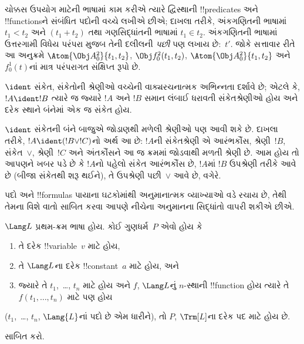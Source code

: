 \documentclass[../../../include/open-logic-section]{subfiles}
\begin{document}
ચોક્કસ ઉપયોગ માટેની ભાષામાં કામ કરીએ ત્યારે દ્વિસ્થાની
!!{predicate}s અને !!{function}sને સંબંધિત પદોની વચ્ચે લખીએ છીએ;
દાખલા તરીકે, અંકગણિતની ભાષામાં $t_1<t_2$ અને $(t_1+t_2)$ તથા
ગણસિદ્ધાંતની ભાષામાં $t_1\in t_2$. અંકગણિતની ભાષામાં ઉત્તરગામી
વિધેય પરંપરા મુજબ તેની દલીલની \emph{પછી} પણ લખાય છે:~$t'$. જોકે
સત્તાવાર રીતે આ અનુક્રમે $\Atom{\Obj A^2_0}{t_1,t_2}$,
$\Obj f^2_0(t_1,t_2)$, $\Atom{\Obj A^2_0}{t_1,t_2}$ અને
$f^1_0(t)$નાં માત્ર પરંપરાગત સંક્ષિપ્ત રૂપો છે.

\begin{defn}[વાક્યરચનાત્મક અભિન્નતા]
$\ident$ સંકેત, સંકેતોની શ્રેણીઓ વચ્ચેની વાક્યરચનાત્મક અભિન્નતા
દર્શાવે છે; એટલે કે, $!A \ident !B$ ત્યારે જ જ્યારે $!A$ અને $!B$
સમાન લંબાઈ ધરાવતી સંકેતશ્રેણીઓ હોય અને દરેક સ્થાને બંનેમાં એક જ
સંકેત હોય.
\end{defn}

$\ident$ સંકેતની બંને બાજુએ જોડાણથી મળેલી શ્રેણીઓ પણ આવી શકે છે.
દાખલા તરીકે, $!A \ident (!B \lor !C)$નો અર્થ આ છે: $!A$ની
સંકેતશ્રેણી એ આરંભકૌંસ, શ્રેણી~$!B$, સંકેત~$\lor$, શ્રેણી~$!C$ અને
અંતકૌંસને આ જ ક્રમમાં જોડવાથી મળતી શ્રેણી છે. આમ હોય તો આપણને ખબર
પડે છે કે $!A$નો પહેલો સંકેત આરંભકૌંસ છે, $!A$માં $!B$ ઉપશ્રેણી
તરીકે આવે છે (બીજા સંકેતથી શરૂ થઈને), તે ઉપશ્રેણી પછી~$\lor$ આવે છે,
વગેરે.

પદો અને !!{formula}s પાયાના ઘટકોમાંથી અનુમાનાત્મક વ્યાખ્યાઓ વડે
રચાય છે, તેથી તેમના વિશે વાતો સાબિત કરવા આપણે નીચેના અનુમાનના
સિદ્ધાંતો વાપરી શકીએ છીએ.

\begin{lem}[\emph{પદો પર અનુમાનનો સિદ્ધાંત}]
    $\Lang L$ પ્રથમ-ક્રમ ભાષા હોય. કોઈ ગુણધર્મ~$P$ એવો હોય કે
    \begin{enumerate}
        \item તે દરેક !!{variable}~$v$ માટે હોય,
        \item તે $\Lang L$ના દરેક !!{constant}~$a$ માટે હોય, અને
        \item જ્યારે તે $t_1$,~\dots, $t_n$ માટે હોય અને $f$,
        $\Lang L$નું $n$-સ્થાની !!{function} હોય ત્યારે તે
        $f(t_1,\dotsc,t_n)$ માટે પણ હોય
    \end{enumerate}
    ($t_1$,~\dots, $t_n$, $\Lang{L}$નાં પદો છે એમ ધારીને),
    તો $P$, $\Trm[L]$ના દરેક પદ માટે હોય છે.
\end{lem}

\begin{prob}
     સાબિત કરો.
\end{prob}
\end{document}
